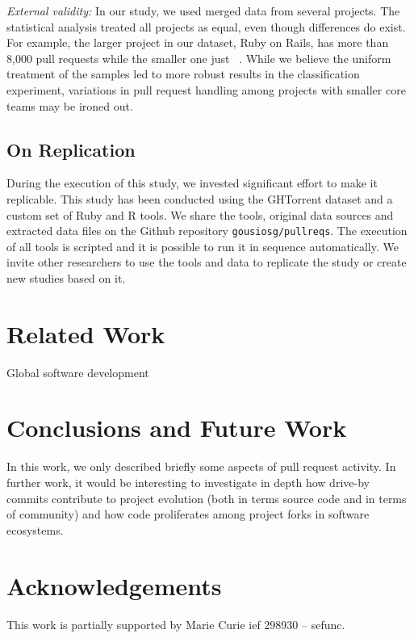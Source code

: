 \documentclass{sig-alternate}
\begin{document}
\noindent\emph{External validity:}
In our study, we used merged data from several projects. The statistical
analysis treated all projects as equal, even though differences do exist.
For example, the larger project in our dataset, Ruby on Rails, 
has more than 8,000 pull requests while the smaller one just ~.
While we believe the uniform treatment of the samples led to more robust
results in the classification experiment, variations in pull request
handling among projects with smaller core teams may be ironed out.

\subsection{On Replication}

During the execution of this study, we invested significant effort to
make it replicable.  This study has been conducted using the GHTorrent dataset
and a custom set of Ruby and R tools. We share the tools, original data sources
and extracted data files on the Github repository \texttt{gousiosg/pullreqs}.
The execution of all tools is scripted and it is possible to run it
in sequence automatically. We invite other researchers to use the tools and data
to replicate the study or create new studies based on it.

\section{Related Work}

\cite{Bird09}
\cite{Cornf10}
\cite{Dabbi12}
\cite{Bird12}
\cite{Barr12}
\cite{Buffe99}
\cite{Mens02}
\cite{Shiha12}

Global software development
\section{Conclusions and Future Work}

In this work, we only described briefly some aspects of pull request activity.
In further work, it would be interesting to investigate in depth how drive-by
commits contribute to project evolution (both in terms source code and in
terms of community) and how code proliferates among project
forks in software ecosystems.

\section*{Acknowledgements}

This work is partially supported by Marie Curie {\sc ief} 298930 -- {\sc sefunc}.



\end{document}
